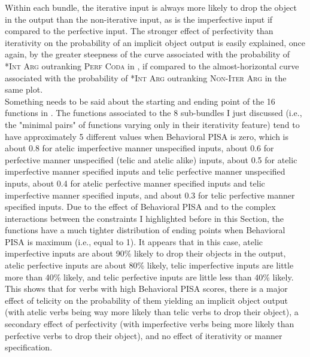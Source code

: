 Within each bundle, the iterative input is always more likely to drop the object in the output than the non-iterative input, as is the imperfective input if compared to the perfective input. The stronger effect of perfectivity than iterativity on the probability of an implicit object output is easily explained, once again, by the greater steepness of the curve associated with the probability of \textsc{*Int Arg} outranking \textsc{Perf Coda} in , if compared to the almost-horizontal curve associated with the probability of \textsc{*Int Arg} outranking \textsc{Non-Iter Arg} in the same plot.\\
Something needs to be said about the starting and ending point of the 16 functions in . The functions associated to the 8 sub-bundles I just discussed (i.e., the "minimal pairs" of functions varying only in their iterativity feature) tend to have approximately 5 different values when Behavioral PISA is zero, which is about 0.8 for atelic imperfective manner unspecified inputs, about 0.6 for perfective manner unspecified (telic and atelic alike) inputs, about 0.5 for atelic imperfective manner specified inputs and telic perfective manner unspecified inputs, about 0.4 for atelic perfective manner specified inputs and telic imperfective manner specified inputs, and about 0.3 for telic perfective manner specified inputs. Due to the effect of Behavioral PISA and to the complex interactions between the constraints I highlighted before in this Section, the functions have a much tighter distribution of ending points when Behavioral PISA is maximum (i.e., equal to 1). It appears that in this case, atelic imperfective inputs are about 90\% likely to drop their objects in the output, atelic perfective inputs are about 80\% likely, telic imperfective inputs are little more than 40\% likely, and telic perfective inputs are little less than 40\% likely. This shows that for verbs with high Behavioral PISA scores, there is a major effect of telicity on the probability of them yielding an implicit object output (with atelic verbs being way more likely than telic verbs to drop their object), a secondary effect of perfectivity (with imperfective verbs being more likely than perfective verbs to drop their object), and no effect of iterativity or manner specification.\\
